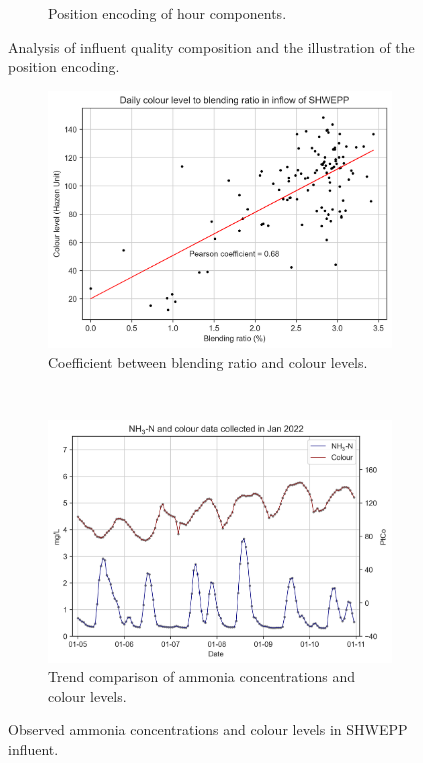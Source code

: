 \begin{figure}[!ht]
\begin{subfigure}[t]{0.5\textwidth}
      \caption{Position encoding of hour components.} \label{fig:pos-encoding}
    \end{subfigure}%
  \caption{Analysis of influent quality composition and the illustration of the position encoding.} \label{fig:blend-pos}
\end{figure}


\begin{figure}[!ht]
    \centering
    \begin{subfigure}[t]{0.7\textwidth}
        \includegraphics[width=\linewidth]{imgs/leachate-effluent-blend-ratio-color-plot/colour-blend-coef.png}
        \caption{Coefficient between blending ratio and colour levels.} \label{fig:blend-colour-coef}
      \end{subfigure}\\
      \hspace{2em}
    \begin{subfigure}[t]{0.7\textwidth}
        \includegraphics[width=\linewidth]{imgs/results/colour-pattern.png}
        \caption{Trend comparison of ammonia concentrations and colour levels.} \label{fig:color-to-nh3-pattern}
      \end{subfigure}%
  \caption{Observed ammonia concentrations and colour levels in SHWEPP influent.} \label{fig:observation-shweep-influent}
\end{figure}

